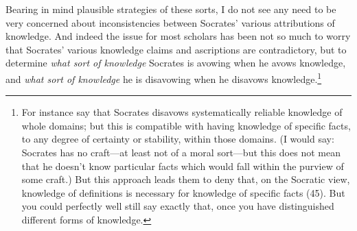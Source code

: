 ﻿\documentclass[11pt]{amsart}
\begin{document}





Bearing in mind plausible strategies of these sorts, I do not see any need to be very concerned about inconsistencies between Socrates' various attributions of knowledge. And indeed the issue for most scholars has been not so much to worry that Socrates' various knowledge claims and ascriptions are contradictory, but to determine \emph{what sort of knowledge} Socrates is avowing when he avows knowledge, and \emph{what sort of knowledge} he is disavowing when he disavows knowledge.\footnote{For instance \citet[esp. p.~36]{brickhouse1994pss} say that Socrates disavows systematically reliable knowledge of whole domains; but this is compatible with having knowledge of specific facts, to any degree of certainty or stability, within those domains. (I would say: Socrates has no craft---at least not of a moral sort---but this does not mean that he doesn't know particular facts which would fall within the purview of some craft.) But this approach leads them to deny that, on the Socratic view, knowledge of definitions is necessary for knowledge of specific facts (45). But you could perfectly well still say exactly that, once you have distinguished different forms of knowledge.}







\end{document}
